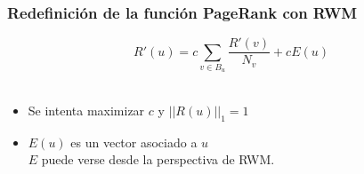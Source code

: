 \documentclass[
10pt, %
aspectratio=169, %
]{beamer}
\begin{document}
	\begin{frame}
		
		\frametitle{Redefinición de la función PageRank con RWM}
		
		$$R'(u) = c \sum_{v \in B_u} \frac{R'(v)}{N_v} + cE(u)$$ \\[2mm] 
		
		\begin{itemize}
			
			\item Se intenta maximizar $c$ y $||R(u)||_1 = 1$
			
			\item $E(u)$ es un vector asociado a $u$\\
			$E$ puede verse desde la perspectiva de RWM.
			
		\end{itemize}

	\end{frame}
	
\end{document}
